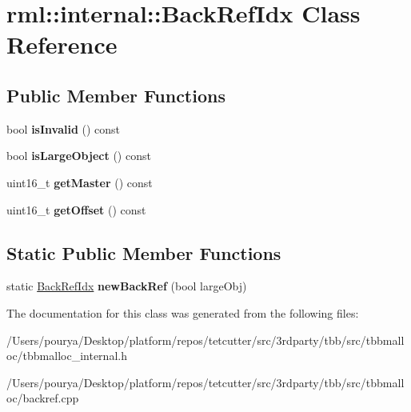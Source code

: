 \hypertarget{classrml_1_1internal_1_1BackRefIdx}{}\section{rml\+:\+:internal\+:\+:Back\+Ref\+Idx Class Reference}
\label{classrml_1_1internal_1_1BackRefIdx}
\subsection*{Public Member Functions}
\begin{DoxyCompactItemize}
\item 
\hypertarget{classrml_1_1internal_1_1BackRefIdx_ab346d77c4d57db0db81111e31c3f86f6}{}bool {\bfseries is\+Invalid} () const \label{classrml_1_1internal_1_1BackRefIdx_ab346d77c4d57db0db81111e31c3f86f6}

\item 
\hypertarget{classrml_1_1internal_1_1BackRefIdx_ac2b5042dd238f9a0fac80d62da3ea531}{}bool {\bfseries is\+Large\+Object} () const \label{classrml_1_1internal_1_1BackRefIdx_ac2b5042dd238f9a0fac80d62da3ea531}

\item 
\hypertarget{classrml_1_1internal_1_1BackRefIdx_a43b2f2a6f5f4bc42f301db8e102054ea}{}uint16\+\_\+t {\bfseries get\+Master} () const \label{classrml_1_1internal_1_1BackRefIdx_a43b2f2a6f5f4bc42f301db8e102054ea}

\item 
\hypertarget{classrml_1_1internal_1_1BackRefIdx_ab298bb5c5905385deb45b5fc1ae1da34}{}uint16\+\_\+t {\bfseries get\+Offset} () const \label{classrml_1_1internal_1_1BackRefIdx_ab298bb5c5905385deb45b5fc1ae1da34}

\end{DoxyCompactItemize}
\subsection*{Static Public Member Functions}
\begin{DoxyCompactItemize}
\item 
\hypertarget{classrml_1_1internal_1_1BackRefIdx_a0797c2ce97f8dfcb7224180f22e66e5c}{}static \hyperlink{classrml_1_1internal_1_1BackRefIdx}{Back\+Ref\+Idx} {\bfseries new\+Back\+Ref} (bool large\+Obj)\label{classrml_1_1internal_1_1BackRefIdx_a0797c2ce97f8dfcb7224180f22e66e5c}

\end{DoxyCompactItemize}


The documentation for this class was generated from the following files\+:\begin{DoxyCompactItemize}
\item 
/\+Users/pourya/\+Desktop/platform/repos/tetcutter/src/3rdparty/tbb/src/tbbmalloc/tbbmalloc\+\_\+internal.\+h\item 
/\+Users/pourya/\+Desktop/platform/repos/tetcutter/src/3rdparty/tbb/src/tbbmalloc/backref.\+cpp\end{DoxyCompactItemize}
